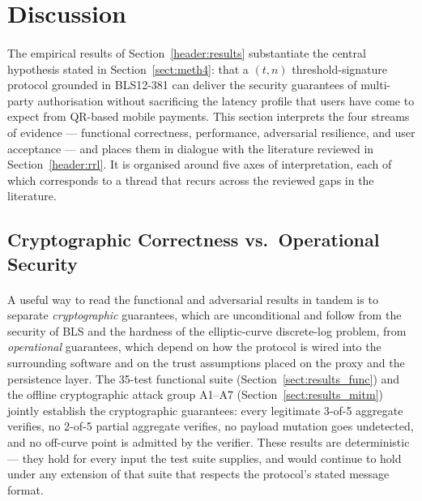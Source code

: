 \section{Discussion}
\label{header:discussion}

\paragraph{}The empirical results of Section~\ref{header:results} substantiate the central hypothesis stated in Section~\ref{sect:meth4}: that a $(t, n)$ threshold-signature protocol grounded in BLS12-381 can deliver the security guarantees of multi-party authorisation without sacrificing the latency profile that users have come to expect from QR-based mobile payments. This section interprets the four streams of evidence --- functional correctness, performance, adversarial resilience, and user acceptance --- and places them in dialogue with the literature reviewed in Section~\ref{header:rrl}. It is organised around five axes of interpretation, each of which corresponds to a thread that recurs across the reviewed gaps in the literature.

\subsection{Cryptographic Correctness vs.\ Operational Security}
\label{sect:disc_crypto}

\paragraph{}A useful way to read the functional and adversarial results in tandem is to separate \textit{cryptographic} guarantees, which are unconditional and follow from the security of BLS and the hardness of the elliptic-curve discrete-log problem, from \textit{operational} guarantees, which depend on how the protocol is wired into the surrounding software and on the trust assumptions placed on the proxy and the persistence layer. The 35-test functional suite (Section~\ref{sect:results_func}) and the offline cryptographic attack group A1--A7 (Section~\ref{sect:results_mitm}) jointly establish the cryptographic guarantees: every legitimate 3-of-5 aggregate verifies, no 2-of-5 partial aggregate verifies, no payload mutation goes undetected, and no off-curve point is admitted by the verifier. These results are deterministic --- they hold for every input the test suite supplies, and would continue to hold under any extension of that suite that respects the protocol's stated message format.

